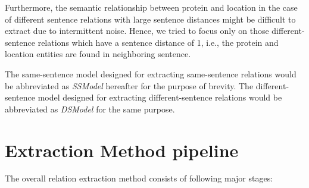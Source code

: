 Furthermore, the semantic relationship between protein and location in the case of different sentence relations with large sentence distances might be difficult to extract due to intermittent noise. Hence, we tried to focus only on those different-sentence relations which have a sentence distance of 1, i.e., the protein and location entities are found in neighboring sentence.

The same-sentence model designed for extracting same-sentence relations would be  abbreviated as \textit{SSModel} hereafter for the purpose of brevity. The different-sentence model designed for extracting different-sentence relations would be abbreviated as \textit{DSModel} for the same purpose.

\section{Extraction Method pipeline}\label{sec:pipeline}


The overall relation extraction method consists of following major stages:


